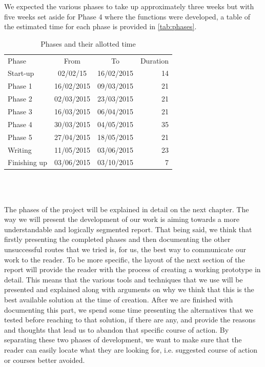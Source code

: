 We expected the various phases to take up approximately three weeks but with five weeks set aside for Phase 4 where the functions were developed, a table of the estimated time for each phase is provided in \autoref{tab:phases}.\\

\begin{table}[h!]
\centering
\begin{tabular}{l | c | c | r}
Phase & From & To & Duration \\

Start-up & 02/02/15 & 16/02/2015 & 14 \\
Phase 1 & 16/02/2015 & 09/03/2015 & 21 \\
Phase 2 & 02/03/2015 & 23/03/2015 & 21 \\
Phase 3 & 16/03/2015 & 06/04/2015 & 21 \\
Phase 4 & 30/03/2015 & 04/05/2015 & 35 \\
Phase 5 & 27/04/2015 & 18/05/2015 & 21 \\
Writing & 11/05/2015 & 03/06/2015 & 23 \\
Finishing up & 03/06/2015 & 03/10/2015 & 7
\end{tabular} \\
\caption{Phases and their allotted time}
\label{tab:phases}
\end{table}\\

The phases of the project will be explained in detail on the next chapter. The way we will present the development of our work is aiming towards a more understandable and logically segmented report. That being said, we think that firstly presenting the completed phases and then documenting the other unsuccessful routes that we tried is, for us, the best way to communicate our work to the reader. To be more specific, the layout of the next section of the report will provide the reader with the process of creating a working prototype in detail. This means that the various tools and techniques that we use will be presented and explained along with arguments on why we think that this is the best available solution at the time of creation. After we are finished with documenting this part, we spend some time presenting the alternatives that we tested before reaching to that solution, if there are any, and provide the reasons and thoughts that lead us to abandon that specific course of action. By separating these two phases of development, we want to make sure that the reader can easily locate what they are looking for, i.e. suggested course of action or courses better avoided. 


